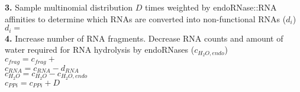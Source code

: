 \documentclass[12pt]{article}
\begin{document}
\begin{algorithm}
\textbf{3.} Sample multinomial distribution $D$ times weighted by endoRNase::RNA affinities to determine which RNAs are converted into non-functional RNAs ($d_{i}$)\\
    \-\hspace{1cm} $d_{i} =$ \\
    
\textbf{4.} Increase number of RNA fragments. Decrease RNA counts and amount of water required for RNA hydrolysis by endoRNases ($c_{H_2O,endo}$)\\
    \-\hspace{1cm} $c_{frag} = c_{frag} +$ \\
    \-\hspace{1cm} $c_{RNA} = c_{RNA} - d_{RNA}$\\
    \-\hspace{1cm} $c_{H_2O} = c_{H_2O} - c_{H_2O,endo}$\\
    \-\hspace{1cm} $c_{PPi} = c_{PPi} + D$\\

\end{algorithm}
\newpage
\end{document}
